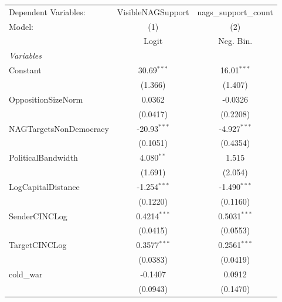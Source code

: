 
\begingroup
\centering
\begin{tabular}{lcc}
   \tabularnewline \midrule \midrule
   Dependent Variables:                                & VisibleNAGSupport & nags\_support\_count\\    
   Model:                                              & (1)               & (2)\\  
                                                       &  Logit            & Neg. Bin.\\  
   \midrule
   \emph{Variables}\\
   Constant                                            & 30.69$^{***}$     & 16.01$^{***}$\\   
                                                       & (1.366)           & (1.407)\\   
   OppositionSizeNorm                                  & 0.0362            & -0.0326\\   
                                                       & (0.0417)          & (0.2208)\\   
   NAGTargetsNonDemocracy                              & -20.93$^{***}$    & -4.927$^{***}$\\   
                                                       & (0.1051)          & (0.4354)\\   
   PoliticalBandwidth                                  & 4.080$^{**}$      & 1.515\\   
                                                       & (1.691)           & (2.054)\\   
   LogCapitalDistance                                  & -1.254$^{***}$    & -1.490$^{***}$\\   
                                                       & (0.1220)          & (0.1160)\\   
   SenderCINCLog                                       & 0.4214$^{***}$    & 0.5031$^{***}$\\   
                                                       & (0.0415)          & (0.0553)\\   
   TargetCINCLog                                       & 0.3577$^{***}$    & 0.2561$^{***}$\\   
                                                       & (0.0383)          & (0.0419)\\   
   cold\_war                                           & -0.1407           & 0.0912\\   
                                                       & (0.0943)          & (0.1470)\\   

\end{tabular}
